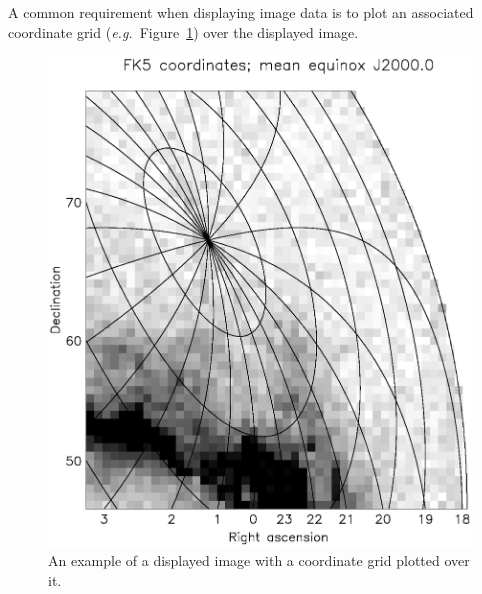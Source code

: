 \documentclass[twoside,11pt]{article}
\newenvironment{latexonly}{}{}
\begin{document}
\begin{latexonly}
   A common requirement when displaying image data is to plot an
   associated coordinate grid ({\em{e.g.}}\ Figure~\ref{fig:overgrid})
   over the displayed image.
   \begin{figure}
   \begin{center}
   \includegraphics[scale=0.7]{sun211_figures/overgrid_bw.eps}
   \caption{An example of a displayed image with a coordinate grid
   plotted over it.}
   \label{fig:overgrid}
   \end{center}
   \end{figure}
\end{latexonly}
\end{document}
